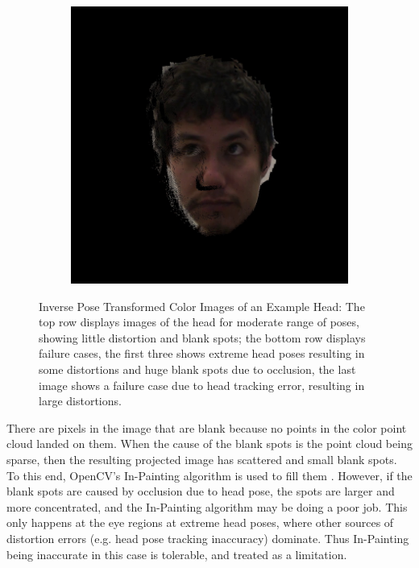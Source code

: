 \documentclass{ut-thesis}
\begin{document}
\begin{figure}[h]
\begin{subfigure}[b]{0.24\textwidth}
	\end{subfigure}
	\begin{subfigure}[b]{0.24\textwidth}
		\includegraphics[width=1.1\linewidth]{./img/eyeimages/trackingError.jpg}
	\end{subfigure}
	\caption{Inverse Pose Transformed Color Images of an Example Head: The top row displays images of the head for moderate range of poses, showing little distortion and blank spots; the bottom row displays failure cases, the first three shows extreme head poses resulting in some distortions and huge blank spots due to occlusion, the last image shows a failure case due to head tracking error, resulting in large distortions.}
	\label{fig:inversePoseResults}
\end{figure}


There are pixels in the image that are blank because no points in the color point cloud landed on them.  When the cause of the blank spots is the point cloud being sparse, then the resulting projected image has scattered and small blank spots.  To this end, OpenCV's In-Painting algorithm is used to fill them \cite{bertalmio2000image}.  However, if the blank spots are caused by occlusion due to head pose, the spots are larger and more concentrated, and the In-Painting algorithm may be doing a poor job.  This only happens at the eye regions at extreme head poses, where other sources of distortion errors (e.g. head pose tracking inaccuracy) dominate.  Thus In-Painting being inaccurate in this case is tolerable, and treated as a limitation.
\end{document}
